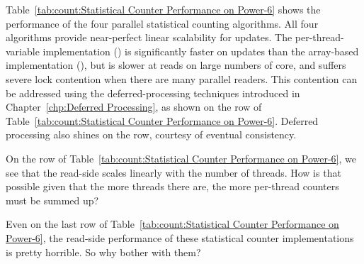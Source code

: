 Table~\ref{tab:count:Statistical Counter Performance on Power-6}
shows the performance of the four parallel statistical counting
algorithms.
All four algorithms provide near-perfect linear scalability for updates.
The per-thread-variable implementation ()
is significantly faster on
updates than the array-based implementation
(), but is slower at reads on large numbers of core,
and suffers severe lock contention when there are many parallel readers.
This contention can be addressed using the deferred-processing
techniques introduced in
Chapter~\ref{chp:Deferred Processing},
as shown on the  row of
Table~\ref{tab:count:Statistical Counter Performance on Power-6}.
Deferred processing also shines on the  row,
courtesy of eventual consistency.

\QuickQuiz{}
	On the  row of
	Table~\ref{tab:count:Statistical Counter Performance on Power-6},
	we see that the read-side scales linearly with the number of
	threads.
	How is that possible given that the more threads there are,
	the more per-thread counters must be summed up?
 \QuickQuizEnd

\QuickQuiz{}
	Even on the last row of
	Table~\ref{tab:count:Statistical Counter Performance on Power-6},
	the read-side performance of these statistical counter
	implementations is pretty horrible.
	So why bother with them?
 \QuickQuizEnd

